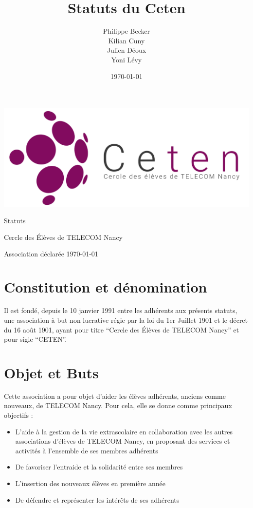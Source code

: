 \documentclass{article} %
\title{Statuts du Ceten}
\author{Philippe Becker\\
	Kilian Cuny\\
	Julien Déoux\\
	Yoni Lévy}
\date\today
\begin{document}

	
	\begin{titlepage}
		\begin{center}
			\includegraphics[width=\textwidth]{images/ceten.png}\par
			\vspace{3cm}
			{\Huge \light Statuts}\par
			\vfill
			{\large Cercle des Élèves de TELECOM Nancy}\par
			{\large \light Association déclarée}
			\vfill
			{\light \today}\par
		\end{center}
	\end{titlepage}

	\section{Constitution et dénomination}
		Il est fondé, depuis le 10 janvier 1991 entre les adhérents aux présents
		statuts, une association à but non lucrative régie par la loi du 1er Juillet
		1901 et le décret du 16 août 1901, ayant pour titre “Cercle des Élèves de
		TELECOM Nancy” et pour sigle “CETEN”.

	\section{Objet et Buts}
		Cette association a pour objet d’aider les élèves adhérents, anciens comme
		nouveaux, de TELECOM Nancy. Pour cela, elle se donne comme principaux
		objectifs :
		\begin{itemize}
			\item L’aide à la gestion de la vie extrascolaire en collaboration avec
			    les autres associations d'élèves de TELECOM Nancy, en proposant des
			    services et activités à l’ensemble de ses membres adhérents
			\item De favoriser l’entraide et la solidarité entre ses membres
			\item L’insertion des nouveaux élèves en première année
			\item De défendre et représenter les intérêts de ses adhérents
		\end{itemize}
\end{document}
